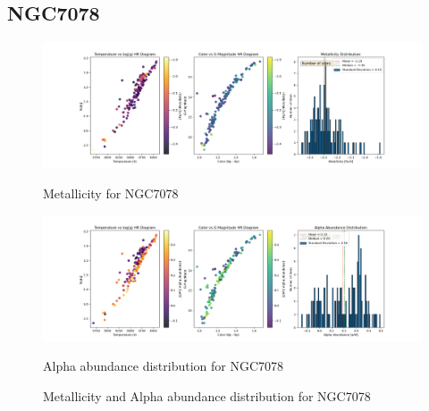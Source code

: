 \documentclass[a4paper,12pt]{article}
\begin{document}
\subsection{NGC7078}
\begin{figure}[H]
    \centering
    \begin{minipage}[b]{0.8\textwidth}
        \centering
        \includegraphics[width=\textwidth]{NGC7078_metalicity.png}
        \caption{Metallicity for NGC7078}
        \label{fig:NGC7078_metalicity}
    \end{minipage}
    \hfill
    \begin{minipage}[b]{0.8\textwidth}
        \centering
        \includegraphics[width=\textwidth]{NGC7078_alpha.png}
        \caption{Alpha abundance distribution for NGC7078}
        \label{fig:NGC7078_alpha}
    \end{minipage}
    \caption{Metallicity and Alpha abundance distribution for NGC7078}
    \label{fig:NGC7078_combined}
\end{figure}
\clearpage
\end{document}
